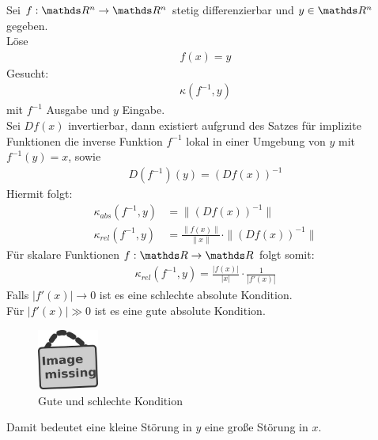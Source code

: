 \begin{Bspe}
  Sei $f:\Ren\rightarrow\Ren$ stetig differenzierbar und $y\in\Ren$ gegeben. \\
  Löse
  \begin{gather*}
    f(x) = y
  \end{gather*}
  Gesucht:
  \begin{gather*}
    \kappa(f^{-1},y)
  \end{gather*}
  mit $f^{-1}$ Ausgabe und $y$ Eingabe. \\
  Sei $Df(x)$ invertierbar, dann existiert aufgrund des Satzes für implizite Funktionen die inverse Funktion $f^{-1}$ lokal in einer Umgebung von $y$ mit $f^{-1}(y)=x$, sowie
  \begin{gather*}
    D(f^{-1})(y) = (Df(x))^{-1}
  \end{gather*}
  Hiermit folgt:
  \begin{align}
    \nonumber
    \kappa_{abs}(f^{-1},y) &= \|(Df(x))^{-1}\| \\
    \kappa_{rel}(f^{-1},y) &= \frac{\|f(x)\|}{\|x\|}\cdot\|(Df(x))^{-1}\|  \label{III.2.15}
  \end{align}
  Für skalare Funktionen $f:\R\rightarrow\R$ folgt somit:
  \begin{gather*}
    \kappa_{rel}(f^{-1},y) = \frac{|f(x)|}{|x|}\cdot \frac{1}{|f'(x)|}
  \end{gather*}
  Falls $|f'(x)|\rightarrow 0$ ist es eine schlechte absolute Kondition. \\
  Für $|f'(x)| \gg 0$ ist es eine gute absolute Kondition.\\
  \begin{figure}
    \parbox{\linewidth}{
      \centering
      \includegraphics[width=2cm]{images/image_missing.jpg}
    }
    \caption{Gute und schlechte Kondition}
  \end{figure}
  
  Damit bedeutet eine kleine Störung in $y$ eine große Störung in $x$.
\end{Bspe}



